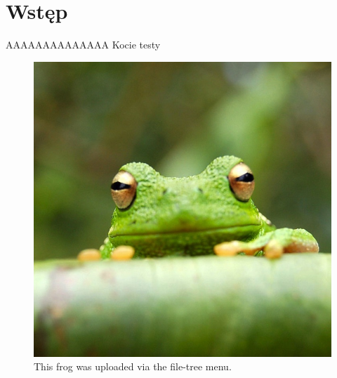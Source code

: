 \chapter{Wstęp}



AAAAAAAAAAAAAA
Kocie testy


\begin{figure}
\centering
\includegraphics[width=0.25\linewidth]{chapters/01-wstep/frog}
\caption{\label{fig:frog}This frog was uploaded via the file-tree menu.}
\end{figure}
